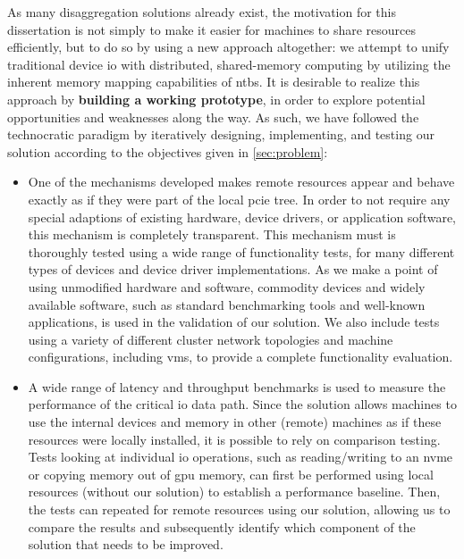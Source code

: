 As many \gls{disaggregation} solutions already exist, the motivation for this dissertation is not simply to make it easier for machines to share resources efficiently, but to do so by using a new approach altogether:
%
we attempt to unify traditional device \gls{io} with distributed, shared-memory computing by utilizing the inherent memory mapping capabilities of \glspl{ntb}.
%
It is desirable to realize this approach by \textbf{building a working prototype}, in order to explore potential opportunities and weaknesses along the way.
%
As such, we have followed the technocratic paradigm by iteratively designing, implementing, and testing our solution according to the objectives given in \cref{sec:problem}:
%
\begin{itemize}
    \item 
        One of the mechanisms developed makes remote resources appear and behave exactly as if they were part of the local \gls{pcie} tree.
        In order to not require any special adaptions of existing hardware, device drivers, or application software, this mechanism is completely transparent.
        This mechanism must is thoroughly tested using a wide range of functionality tests, for many different types of devices and device driver implementations.
        As we make a point of using unmodified hardware and software, commodity devices and widely available software, such as standard benchmarking tools and well-known applications, is used in the validation of our solution.
        We also include tests using a variety of different cluster network topologies and machine configurations, including \glspl{vm}, to provide a complete functionality evaluation.

    \item 
        A wide range of latency and throughput benchmarks is used to measure the performance of the critical \gls{io} data path.
        Since the solution allows machines to use the internal devices and memory in other (remote) machines as if these resources were locally installed, it is possible to rely on comparison testing.
        Tests looking at individual \gls{io} operations, such as reading/writing to an \gls{nvme} or copying memory out of \gls{gpu} memory, can first be performed using local resources (without our solution) to establish a performance baseline.
        Then, the tests can repeated for remote resources using our solution, allowing us to compare the results and subsequently identify which component of the solution that needs to be improved.


\end{itemize}
